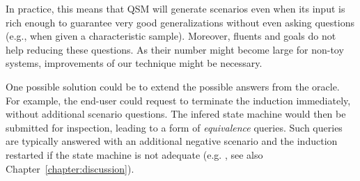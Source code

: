 \begin{itemize}
In practice, this means that QSM will generate scenarios even when its input is rich enough to guarantee very good generalizations without even asking questions (e.g., when given a characteristic sample). Moreover, fluents and goals do not help reducing these questions. As their number might become large for non-toy systems, improvements of our technique might be necessary.

One possible solution could be to extend the possible answers from the oracle. For example, the end-user could request to terminate the induction immediately, without additional scenario questions. The infered state machine would then be submitted for inspection, leading to a form of \emph{equivalence} queries. Such queries are typically answered with an additional negative scenario and the induction restarted if the state machine is not adequate (e.g. \cite{Angluin:1987}, see also Chapter~\ref{chapter:discussion}).

\end{itemize}

